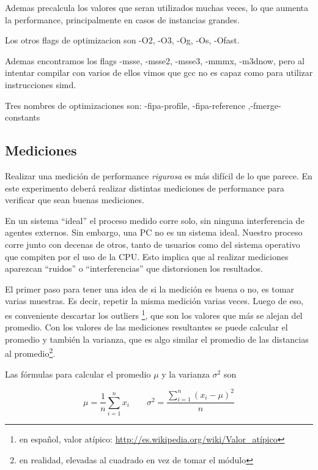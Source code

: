 Ademas precalcula los valores que seran utilizados muchas veces, lo que aumenta la performance, principalmente en casos de instancias grandes.

Los otros flags de optimizacion son -O2, -O3, -Og, -Os, -Ofast.

Ademas encontramos los flags -msse, -msse2, -msse3, -mmmx, -m3dnow, pero al intentar compilar con varios de ellos vimos que gcc no es capaz como para utilizar instrucciones simd.

Tres nombres de optimizaciones son: -fipa-profile, -fipa-reference ,-fmerge-constants 



\subsection{Mediciones}

Realizar una medición de performance \emph{rigurosa} es más difícil de lo 
que parece. 
En este experimento deberá realizar distintas mediciones de performance 
para verificar que sean buenas mediciones.

En un sistema ``ideal'' el proceso medido corre solo, sin ninguna 
interferencia de agentes externos. 
Sin embargo, una PC no es un sistema ideal. 
Nuestro proceso corre junto con decenas de otros, tanto de usuarios como 
del sistema operativo que compiten por el uso de la CPU. 
Esto implica que al realizar mediciones aparezcan ``ruidos'' o 
``interferencias'' que distorsionen los resultados.

El primer paso para tener una idea de si la medición es buena o no, 
es tomar varias muestras. 
Es decir, repetir la misma medición varias veces.
Luego de eso, es conveniente descartar los outliers
\footnote{en español, valor atípico: \url{http://es.wikipedia.org/wiki/Valor_atípico}}, 
que son los valores que más se alejan del promedio. 
Con los valores de las mediciones resultantes se puede calcular el promedio 
y también la varianza, que es algo similar el promedio de las distancias al 
promedio\footnote{en realidad, elevadas al cuadrado en vez de tomar el módulo}.

Las fórmulas para calcular el promedio $\mu$ y la varianza $\sigma^2$ son

$$
\mu = \frac{1}{n}\sum_{i=1}^{n} x_i \qquad \sigma^2 = \frac{\displaystyle\sum_{i=1}^{n}(x_i - \mu)^2} {n}
$$

